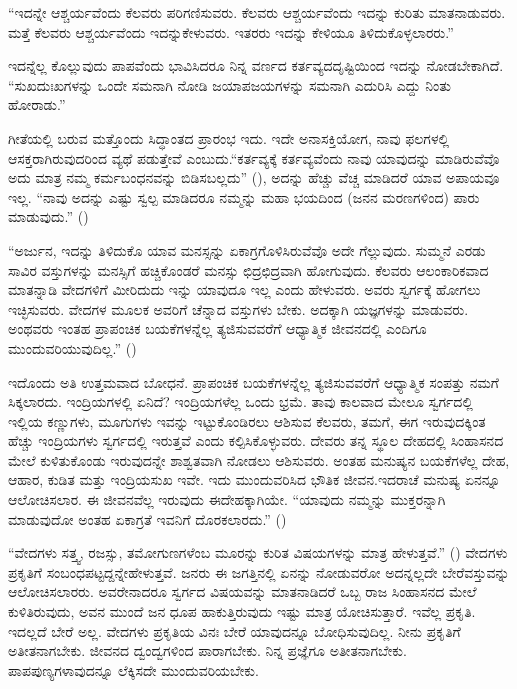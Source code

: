 “ಇದನ್ನೇ ಆಶ್ಚರ್ಯವೆಂದು ಕೆಲವರು ಪರಿಗಣಿಸುವರು. ಕೆಲವರು ಆಶ್ಚರ್ಯವೆಂದು ಇದನ್ನು ಕುರಿತು ಮಾತನಾಡುವರು. ಮತ್ತೆ ಕೆಲವರು ಆಶ್ಚರ್ಯವೆಂದು ಇದನ್ನು\break ಕೇಳುವರು. ಇತರರು ಇದನ್ನು ಕೇಳಿಯೂ ತಿಳಿದುಕೊಳ್ಳಲಾರರು.” 

ಇದನ್ನೆಲ್ಲ ಕೊಲ್ಲುವುದು ಪಾಪವೆಂದು ಭಾವಿಸಿದರೂ ನಿನ್ನ ವರ್ಣದ ಕರ್ತವ್ಯದ\break ದೃಷ್ಟಿಯಿಂದ ಇದನ್ನು ನೋಡಬೇಕಾಗಿದೆ. “ಸುಖದುಃಖಗಳನ್ನು ಒಂದೇ ಸಮನಾಗಿ ನೋಡಿ ಜಯಾಪಜಯಗಳನ್ನು ಸಮನಾಗಿ ಎದುರಿಸಿ ಎದ್ದು ನಿಂತು ಹೋರಾಡು.” 

ಗೀತೆಯಲ್ಲಿ ಬರುವ ಮತ್ತೊಂದು ಸಿದ್ಧಾಂತದ ಪ್ರಾರಂಭ ಇದು. ಇದೇ ಅನಾಸಕ್ತಿಯೋಗ, ನಾವು ಫಲಗಳಲ್ಲಿ ಆಸಕ್ತರಾಗಿರುವುದರಿಂದ ವ್ಯಥೆ ಪಡುತ್ತೇವೆ ಎಂಬುದು.\break “ಕರ್ತವ್ಯಕ್ಕೆ ಕರ್ತವ್ಯವೆಂದು ನಾವು ಯಾವುದನ್ನು ಮಾಡಿರುವೆವೊ ಅದು ಮಾತ್ರ ನಮ್ಮ ಕರ್ಮಬಂಧನವನ್ನು ಬಿಡಿಸಬಲ್ಲದು” (), ಅದನ್ನು ಹೆಚ್ಚು ವೆಚ್ಚ ಮಾಡಿದರೆ ಯಾವ ಅಪಾಯವೂ ಇಲ್ಲ. “ನಾವು ಅದನ್ನು ಎಷ್ಟು ಸ್ವಲ್ಪ ಮಾಡಿದರೂ ನಮ್ಮನ್ನು ಮಹಾ ಭಯದಿಂದ (ಜನನ ಮರಣಗಳಿಂದ) ಪಾರು ಮಾಡುವುದು.” ()

“ಅರ್ಜುನ, ಇದನ್ನು ತಿಳಿದುಕೊ ಯಾವ ಮನಸ್ಸನ್ನು ಏಕಾಗ್ರಗೊಳಿಸಿರುವೆವೊ ಅದೇ ಗೆಲ್ಲುವುದು. ಸುಮ್ಮನೆ ಎರಡು ಸಾವಿರ ವಸ್ತುಗಳನ್ನು ಮನಸ್ಸಿಗೆ ಹಚ್ಚಿಕೊಂಡರೆ ಮನಸ್ಸು ಛಿದ್ರಛಿದ್ರವಾಗಿ ಹೋಗುವುದು. ಕೆಲವರು ಆಲಂಕಾರಿಕವಾದ ಮಾತನ್ನಾಡಿ ವೇದಗಳಿಗೆ ಮೀರಿದುದು ಇನ್ನು ಯಾವುದೂ ಇಲ್ಲ ಎಂದು ಹೇಳುವರು. ಅವರು ಸ್ವರ್ಗಕ್ಕೆ ಹೋಗಲು ಇಚ್ಛಿಸುವರು. ವೇದಗಳ ಮೂಲಕ ಅವರಿಗೆ ಚೆನ್ನಾದ ವಸ್ತುಗಳು ಬೇಕು. ಅದಕ್ಕಾಗಿ ಯಜ್ಞಗಳನ್ನು ಮಾಡುವರು. ಅಂಥವರು ಇಂತಹ ಪ್ರಾಪಂಚಿಕ ಬಯಕೆಗಳನ್ನೆಲ್ಲ ತ್ಯಜಿಸುವವರೆಗೆ ಆಧ್ಯಾತ್ಮಿಕ ಜೀವನದಲ್ಲಿ ಎಂದಿಗೂ ಮುಂದುವರಿಯುವುದಿಲ್ಲ.” ()

ಇದೊಂದು ಅತಿ ಉತ್ತಮವಾದ ಬೋಧನೆ. ಪ್ರಾಪಂಚಿಕ ಬಯಕೆಗಳನ್ನೆಲ್ಲ ತ್ಯಜಿಸುವ\-ವರೆಗೆ ಆಧ್ಯಾತ್ಮಿಕ ಸಂಪತ್ತು ನಮಗೆ ಸಿಕ್ಕಲಾರದು. ಇಂದ್ರಿಯಗಳಲ್ಲಿ ಏನಿದೆ? ಇಂದ್ರಿಯಗಳೆಲ್ಲ ಒಂದು ಭ್ರಮೆ. ತಾವು ಕಾಲವಾದ ಮೇಲೂ ಸ್ವರ್ಗದಲ್ಲಿ ಇಲ್ಲಿಯ ಕಣ್ಣುಗಳು, ಮೂಗುಗಳು ಇವನ್ನು ಇಟ್ಟುಕೊಂಡಿರಲು ಆಶಿಸುವ ಕೆಲವರು, ತಮಗೆ, ಈಗ ಇರುವುದಕ್ಕಿಂತ ಹೆಚ್ಚು ಇಂದ್ರಿಯಗಳು ಸ್ವರ್ಗದಲ್ಲಿ ಇರುತ್ತವೆ ಎಂದು ಕಲ್ಪಿಸಿಕೊಳ್ಳುವರು. ದೇವರು ತನ್ನ ಸ್ಥೂಲ ದೇಹದಲ್ಲಿ ಸಿಂಹಾಸನದ ಮೇಲೆ ಕುಳಿತುಕೊಂಡು ಇರುವುದನ್ನೇ ಶಾಶ್ವತವಾಗಿ ನೋಡಲು ಆಶಿಸುವರು. ಅಂತಹ ಮನುಷ್ಯನ ಬಯಕೆಗಳೆಲ್ಲ ದೇಹ, ಆಹಾರ, ಕುಡಿತ ಮತ್ತು ಇಂದ್ರಿಯಸುಖ ಇವೇ. ಇದು ಮುಂದುವರಿಸಿದ ಭೌತಿಕ ಜೀವನ.\break ಇದರಾಚೆ ಮನುಷ್ಯ ಏನನ್ನೂ ಆಲೋಚಿಸಲಾರ. ಈ ಜೀವನವೆಲ್ಲ ಇರುವುದು ಈ\break ದೇಹಕ್ಕಾಗಿಯೇ. “ಯಾವುದು ನಮ್ಮನ್ನು ಮುಕ್ತರನ್ನಾಗಿ ಮಾಡುವುದೋ ಅಂತಹ ಏಕಾಗ್ರತೆ ಇವನಿಗೆ ದೊರಕಲಾರದು.” ()

“ವೇದಗಳು ಸತ್ತ್ವ, ರಜಸ್ಸು, ತಮೋಗುಣಗಳೆಂಬ ಮೂರನ್ನು ಕುರಿತ ವಿಷಯಗಳನ್ನು ಮಾತ್ರ ಹೇಳುತ್ತವೆ.” () ವೇದಗಳು ಪ್ರಕೃತಿಗೆ ಸಂಬಂಧಪಟ್ಟದ್ದನ್ನೇ\break ಹೇಳುತ್ತವೆ. ಜನರು ಈ ಜಗತ್ತಿನಲ್ಲಿ ಏನನ್ನು ನೋಡುವರೋ ಅದನ್ನಲ್ಲದೇ ಬೇರೆ\break ವಸ್ತುವನ್ನು ಆಲೋಚಿಸಲಾರರು. ಅವರೇನಾದರೂ ಸ್ವರ್ಗದ ವಿಷಯವನ್ನು ಮಾತನಾಡಿದರೆ ಒಬ್ಬ ರಾಜ ಸಿಂಹಾಸನದ ಮೇಲೆ ಕುಳಿತಿರುವುದು, ಅವನ ಮುಂದೆ ಜನ ಧೂಪ ಹಾಕುತ್ತಿರುವುದು ಇಷ್ಟು ಮಾತ್ರ ಯೋಚಿಸುತ್ತಾರೆ. ಇವೆಲ್ಲ ಪ್ರಕೃತಿ. ಇದಲ್ಲದೆ ಬೇರೆ ಅಲ್ಲ. ವೇದಗಳು ಪ್ರಕೃತಿಯ ವಿನಃ ಬೇರೆ ಯಾವುದನ್ನೂ ಬೋಧಿಸುವುದಿಲ್ಲ. ನೀನು ಪ್ರಕೃತಿಗೆ ಅತೀತನಾಗಬೇಕು. ಜೀವನದ ದ್ವಂದ್ವಗಳಿಂದ ಪಾರಾಗಬೇಕು. ನಿನ್ನ ಪ್ರಜ್ಞೆಗೂ ಅತೀತನಾಗಬೇಕು. ಪಾಪಪುಣ್ಯಗಳಾವುದನ್ನೂ ಲೆಕ್ಕಿಸದೇ ಮುಂದುವರಿಯಬೇಕು.

